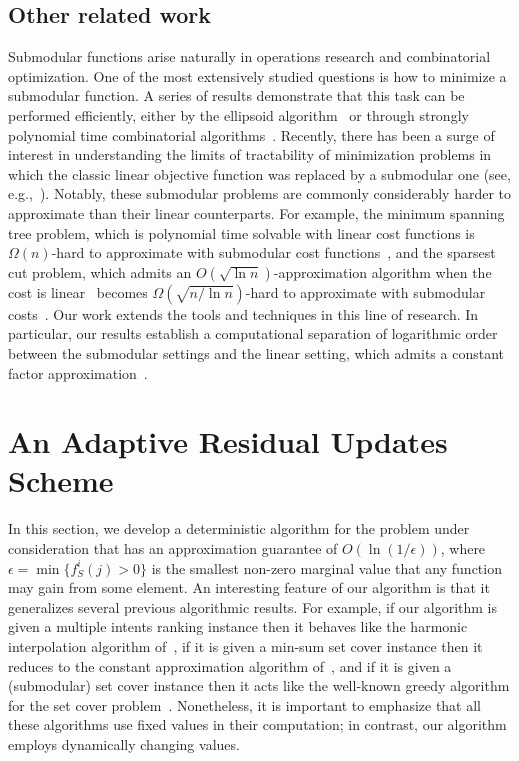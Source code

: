 \documentclass[11pt]{article}
\theoremstyle{plain}
\theoremstyle{definition}
\begin{document}
\subsection{Other related work}
Submodular functions arise naturally in operations research and
combinatorial optimization. One of the most extensively studied
questions is how to minimize a submodular function. A series of
results demonstrate that this task can be performed efficiently,
either by the ellipsoid algorithm~\cite{GrotschelLS81} or through
strongly polynomial time combinatorial
algorithms~\cite{Schrijver00,IwataFF01,Iwata03,Orlin07,Iwata08,IwataO09}.
Recently, there has been a surge of interest in understanding the
limits of tractability of minimization problems in which the
classic linear objective function was replaced by a submodular one
(see, e.g.,~\cite{SvitkinaF08,GoemansHIM09,GoelKTW09,IwataN09}).
Notably, these submodular problems are commonly considerably
harder to approximate than their linear counterparts. For example,
the minimum spanning tree problem, which is polynomial time
solvable with linear cost functions is $\Omega(n)$-hard to
approximate with submodular cost functions~\cite{GoelKTW09}, and
the sparsest cut problem, which admits an $O(\sqrt{\ln
n})$-approximation algorithm when the cost is
linear~\cite{AroraHK10} becomes $\Omega(\sqrt{n / \ln n})$-hard to
approximate with submodular costs~\cite{SvitkinaF08}. Our work
extends the tools and techniques in this line of research. In
particular, our results establish a computational separation of
logarithmic order between the submodular settings and the linear
setting, which admits a constant factor
approximation~\cite{AzarG10}.


\section{An Adaptive Residual Updates Scheme} \label{sec:AdaptiveScheme}

In this section, we develop a deterministic algorithm for the
problem under consideration that has an approximation guarantee of
$O(\ln(1 / \epsilon))$, where $\epsilon = \min \{f^i_S(j)
> 0\}$ is the smallest non-zero marginal value that any function
may gain from some element. An interesting feature of our
algorithm is that it generalizes several previous algorithmic
results. For example, if our algorithm is given a multiple intents
ranking instance then it behaves like the harmonic interpolation
algorithm of~\cite{AzarGY09}, if it is given a min-sum set cover
instance then it reduces to the constant approximation algorithm
of~\cite{FeigeLT04}, and if it is given a (submodular) set cover
instance then it acts like the well-known greedy algorithm for the
set cover problem~\cite{Wolsey82b}. Nonetheless, it is important
to emphasize that all these algorithms use fixed values in their
computation; in contrast, our algorithm employs dynamically
changing values.
\end{document}
